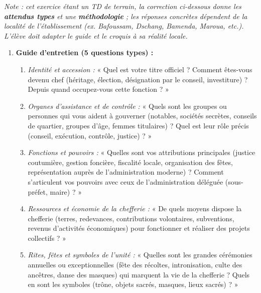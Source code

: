 \documentclass[11pt]{article}
\begin{document}
\begin{corrige}
\textit{Note : cet exercice étant un TD de terrain, la correction ci-dessous donne les \textbf{attendus types} et une \textbf{méthodologie} ; les réponses concrètes dépendent de la localité de l'établissement (ex. Bafoussam, Dschang, Bamenda, Maroua, etc.). L'élève doit adapter le guide et le croquis à sa réalité locale.}

\begin{enumerate}
\item \textbf{Guide d'entretien (5 questions types) :}
\begin{enumerate}
\item \textit{Identité et accession :} « Quel est votre titre officiel ? Comment êtes-vous devenu chef (héritage, élection, désignation par le conseil, investiture) ? Depuis quand occupez-vous cette fonction ? »
\item \textit{Organes d'assistance et de contrôle :} « Quels sont les groupes ou personnes qui vous aident à gouverner (notables, sociétés secrètes, conseils de quartier, groupes d'âge, femmes titulaires) ? Quel est leur rôle précis (conseil, exécution, contrôle, justice) ? »
\item \textit{Fonctions et pouvoirs :} « Quelles sont vos attributions principales (justice coutumière, gestion foncière, fiscalité locale, organisation des fêtes, représentation auprès de l'administration moderne) ? Comment s'articulent vos pouvoirs avec ceux de l'administration déléguée (sous-préfet, maire) ? »
\item \textit{Ressources et économie de la chefferie :} « De quels moyens dispose la chefferie (terres, redevances, contributions volontaires, subventions, revenus d'activités économiques) pour fonctionner et réaliser des projets collectifs ? »
\item \textit{Rites, fêtes et symboles de l'unité :} « Quelles sont les grandes cérémonies annuelles ou exceptionnelles (fête des récoltes, intronisation, culte des ancêtres, danse des masques) qui marquent la vie de la chefferie ? Quels en sont les symboles (trône, objets sacrés, masques, lieux sacrés) ? »
\end{enumerate}


\end{enumerate}
\end{corrige}
\end{document}
